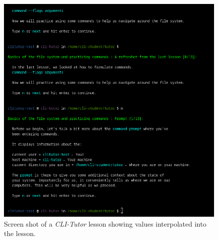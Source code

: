 \begin{figure}[htbp]
	\centering
	\includegraphics[width=1\textwidth]{img/cliexpansionfull}
	\caption{Screen shot of a \textit{CLI-Tutor} lesson showing values interpolated into the lesson.}
	\label{fig:templateexpansion}
\end{figure}
